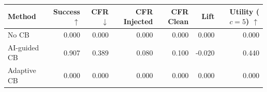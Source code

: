 \begin{tabular}{lrrrrrr}
\toprule
Method & Success $\uparrow$ & CFR $\downarrow$ & CFR Injected & CFR Clean & Lift & Utility ($c=5$) $\uparrow$ \\
\midrule
No CB & 0.000 & 0.000 & 0.000 & 0.000 & 0.000 & 0.000 \\
AI-guided CB & 0.907 & 0.389 & 0.080 & 0.100 & -0.020 & 0.440 \\
Adaptive CB & 0.000 & 0.000 & 0.000 & 0.000 & 0.000 & 0.000 \\
\bottomrule
\end{tabular}
